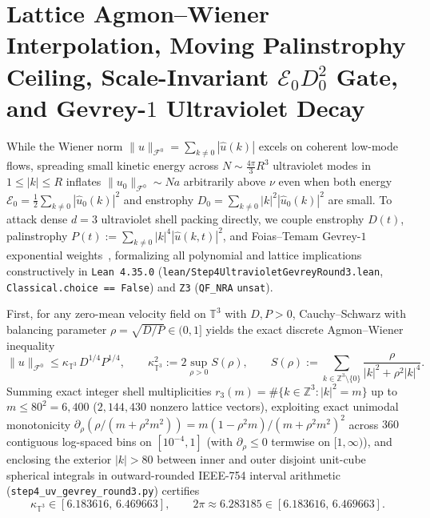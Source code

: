 \documentclass[11pt]{article}
\theoremstyle{plain}
\theoremstyle{definition}
\begin{document}
\section{Lattice Agmon--Wiener Interpolation, Moving Palinstrophy Ceiling, Scale-Invariant $\mathcal{E}_0 D_0^2$ Gate, and Gevrey-$1$ Ultraviolet Decay}\label{sec:step4}

While the Wiener norm $\|u\|_{\mathcal{F}^0} = \sum_{k \neq 0} |\hat{u}(k)|$ excels on coherent low-mode flows, spreading small kinetic energy across $N \sim \frac{4\pi}{3} R^3$ ultraviolet modes in $1 \le |k| \le R$ inflates $\|u_0\|_{\mathcal{F}^0} \sim N a$ arbitrarily above $\nu$ even when both energy $\mathcal{E}_0 = \frac{1}{2}\sum_{k \neq 0} |\hat{u}_0(k)|^2$ and enstrophy $D_0 = \sum_{k \neq 0} |k|^2 |\hat{u}_0(k)|^2$ are small. To attack dense $d = 3$ ultraviolet shell packing directly, we couple enstrophy $D(t)$, palinstrophy $P(t) := \sum_{k \neq 0} |k|^4 |\hat{u}(k,t)|^2$, and Foias--Temam Gevrey-$1$ exponential weights~\cite{foiastemam1989,doeringtiti1995}, formalizing all polynomial and lattice implications constructively in \texttt{Lean 4.35.0} (\texttt{lean/\allowbreak Step4UltravioletGevreyRound3.lean}, \texttt{Classical.choice == False}) and \texttt{Z3} (\texttt{QF\_NRA} \texttt{unsat}).

First, for any zero-mean velocity field on $\mathbb{T}^3$ with $D, P > 0$, Cauchy--Schwarz with balancing parameter $\rho = \sqrt{D/P} \in (0,1]$ yields the exact discrete Agmon--Wiener inequality
\begin{equation}\label{eq:agmon_wiener}
  \|u\|_{\mathcal{F}^0} \le \kappa_{\mathbb{T}^3}\,D^{1/4} P^{1/4}, \qquad \kappa_{\mathbb{T}^3}^2 := 2 \sup_{\rho > 0} S(\rho), \qquad S(\rho) := \sum_{k \in \mathbb{Z}^3 \setminus \{0\}} \frac{\rho}{|k|^2 + \rho^2 |k|^4}.
\end{equation}
Summing exact integer shell multiplicities $r_3(m) = \#\{k \in \mathbb{Z}^3 : |k|^2 = m\}$ up to $m \le 80^2 = 6{,}400$ ($2{,}144{,}430$ nonzero lattice vectors), exploiting exact unimodal monotonicity $\partial_\rho(\rho/(m + \rho^2 m^2)) = m(1 - \rho^2 m)/(m + \rho^2 m^2)^2$ across $360$ contiguous log-spaced bins on $[10^{-4}, 1]$ (with $\partial_\rho \le 0$ termwise on $[1,\infty)$), and enclosing the exterior $|k| > 80$ between inner and outer disjoint unit-cube spherical integrals in outward-rounded IEEE-754 interval arithmetic (\texttt{step4\_uv\_gevrey\_round3.py}) certifies
\begin{equation}\label{eq:kappa_enclosure}
  \kappa_{\mathbb{T}^3} \in [6.183616, \, 6.469663], \qquad 2\pi \approx 6.283185 \in [6.183616, \, 6.469663].
\end{equation}
\end{document}
